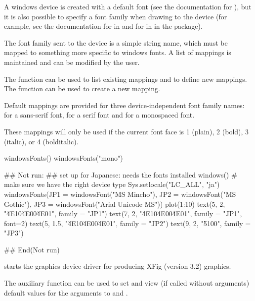 \begin{Details}\relax
A windows device is created with a default font (see
the documentation for ), but it is also possible
to specify a font family when drawing to the device (for example, see
the documentation for  in  and for
 in  in the  package).

The font family sent to the device is a simple string name, which must be
mapped to something more specific to windows fonts.  A list of
mappings is maintained and can be modified by the user.

The  function can be used to list existing
mappings and to define new mappings.  The 
function can be used to create a new mapping.

Default mappings are provided for three device-independent font family
names:  for a sans-serif font,  for a serif
font and  for a monospaced font.

These mappings will only be used if the current font face is
1 (plain), 2 (bold), 3 (italic), or 4 (bolditalic).
\end{Details}
%
\begin{SeeAlso}\relax
{}
\end{SeeAlso}
%
\begin{Examples}
\begin{ExampleCode}
windowsFonts()
windowsFonts("mono")

## Not run: ## set up for Japanese: needs the fonts installed
windows()  # make sure we have the right device type
Sys.setlocale("LC_ALL", "ja")
windowsFonts(JP1 = windowsFont("MS Mincho"),
             JP2 = windowsFont("MS Gothic"),
             JP3 = windowsFont("Arial Unicode MS"))
plot(1:10)
text(5, 2, "\u{4E10}\u{4E00}\u{4E01}", family = "JP1")
text(7, 2, "\u{4E10}\u{4E00}\u{4E01}", family = "JP1", font=2)
text(5, 1.5, "\u{4E10}\u{4E00}\u{4E01}", family = "JP2")
text(9, 2, "\u{5100}", family = "JP3")

## End(Not run)
\end{ExampleCode}
\end{Examples}
%
\begin{Description}\relax
{} starts the graphics device driver for producing XFig
(version 3.2) graphics.

The auxiliary function  can be used to set and view
(if called without arguments) default values for the arguments to
 and .
\end{Description}
